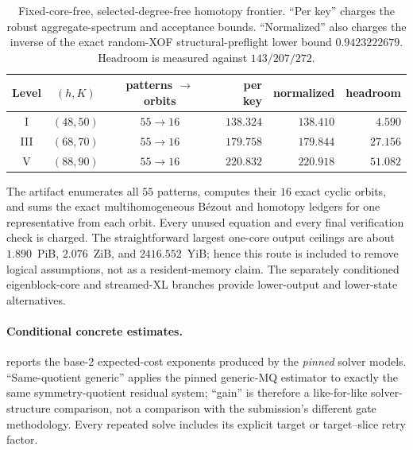 \documentclass[11pt]{article}
\begin{document}
\begin{table}[H]
\centering
\caption{Fixed-core-free, selected-degree-free homotopy frontier.  ``Per key''
charges the robust aggregate-spectrum and acceptance bounds.  ``Normalized''
also charges the inverse of the exact random-XOF structural-preflight lower
bound $0.9423222679$.  Headroom is measured against $143/207/272$.}
\label{tab:selected-homotopy-frontier}
\small
\setlength{\tabcolsep}{4.0pt}
\begin{tabular}{@{}c c c r r r@{}}
\toprule
Level & $(h,K)$ & patterns $\to$ orbits & per key & normalized & headroom\\
\midrule
I   & $(48,50)$ & $55\to16$ & $138.324$ & $138.410$ & $4.590$\\
III & $(68,70)$ & $55\to16$ & $179.758$ & $179.844$ & $27.156$\\
V   & $(88,90)$ & $55\to16$ & $220.832$ & $220.918$ & $51.082$\\
\bottomrule
\end{tabular}
\end{table}

The artifact enumerates all $55$ patterns, computes their $16$ exact cyclic
orbits, and sums the exact multihomogeneous B\'ezout and homotopy ledgers for
one representative from each orbit.  Every unused equation and every final
verification check is charged.  The straightforward largest one-core output
ceilings are about $1.890$~PiB, $2.076$~ZiB, and $2416.552$~YiB; hence this
route is included to remove logical assumptions, not as a resident-memory
claim.  The separately conditioned eigenblock-core and streamed-XL branches
provide lower-output and lower-state alternatives.

\paragraph{Conditional concrete estimates.}
 reports the base-2 expected-cost exponents produced by the
\emph{pinned} solver models.  ``Same-quotient generic'' applies the pinned
generic-MQ estimator to exactly the same symmetry-quotient residual system;
``gain'' is therefore a like-for-like solver-structure comparison, not a
comparison with the submission's different gate methodology.  Every repeated
solve includes its explicit target or target--slice retry factor.
\end{document}
